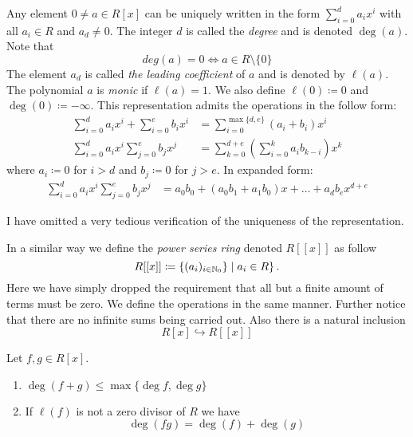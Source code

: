 \documentclass[master.tex]{subfiles}
\newcommand{\poly}[3]{\sum_{#1=0}^#3 {#2}_{#1}x^{#1}}
\begin{document}
\begin{defn}
  Any element \(0 \neq a \in R[x]\) can be uniquely written in the form \(\poly{i}{a}{d}\) with all \(a_i \in R\) and
  \(a_d \neq 0\). The integer \(d\) is called the \emph{degree} and is denoted \(\deg(a)\). Note that
  \[deg(a) = 0 \iff a \in R \setminus \{0\}\]
  The element \(a_d\) is called \emph{the leading coefficient} of \(a\) and is denoted by \(\ell(a)\). The polynomial
  \(a\) is \emph{monic} if \(\ell(a)=1\). We also define \(\ell(0) \coloneqq 0\) and \(\deg(0) \coloneqq -
  \infty\). This representation admits the operations in the follow form:
  \begin{align*}
    \poly{i}{a}{d}+\poly{i}{b}{e} &= \sum_{i=0}^{\max\{d,e\}}(a_i+b_i)x^i\\
    \poly{i}{a}{d}\poly{j}{b}{e}  &= \sum_{k=0}^{d+e}\left(\sum_{i=0}^k a_i b_{k-i}\right)x^k                              
  \end{align*}
  where \(a_i \coloneqq 0\) for \(i > d\) and \(b_j \coloneqq 0\) for \(j > e\). In expanded form:
  \begin{align*}
    \poly{i}{a}{d}\poly{j}{b}{e} &= a_0 b_0 + (a_0 b_1 + a_1 b_0)x + \ldots + a_db_e x^{d+e}
  \end{align*}
\end{defn}
I have omitted a very tedious verification of the uniqueness of the representation.
\begin{rmk}
  In a similar way we define the \emph{power series ring} denoted \(R[[x]]\) as follow
  \[R[[x]] \coloneqq \left\{(a_i)_{i \in {\mathbb N}_0}\} \mid a_i \in R\right\}.\]
  Here we have simply dropped the requirement that all but a finite amount of terms must be zero. We define the
  operations in the same manner. Further notice that there are no infinite sums being carried out. Also there is a
  natural inclusion
  \[R[x] \hookrightarrow R[[x]]\]
\end{rmk}

\begin{lem}
  Let \(f,g \in R[x]\). 
  \begin{enumerate}[label=(\alph*)]
  \item \(\deg(f+g) \le \max \{\deg f, \deg g\}\)
  \item If \(\ell(f)\) is not a zero divisor of \(R\) we have
    \[\deg(fg) = \deg(f)+\deg(g)\]
  \end{enumerate}
\end{lem}
\end{document}
